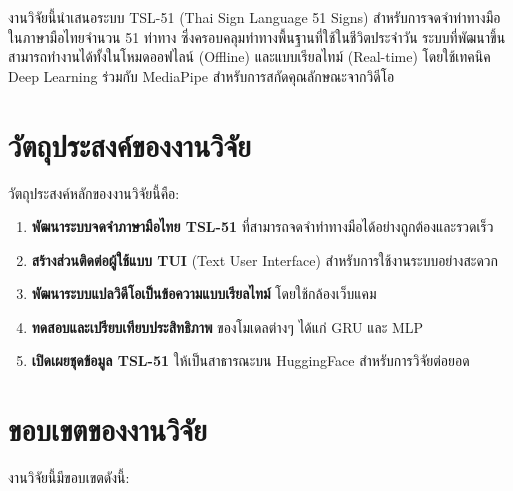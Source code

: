 \documentclass[12pt,a4paper]{report}
\begin{document}
งานวิจัยนี้นำเสนอระบบ TSL-51 (Thai Sign Language 51 Signs) สำหรับการจดจำท่าทางมือในภาษามือไทยจำนวน 51 ท่าทาง 
ซึ่งครอบคลุมท่าทางพื้นฐานที่ใช้ในชีวิตประจำวัน ระบบที่พัฒนาขึ้นสามารถทำงานได้ทั้งในโหมดออฟไลน์ (Offline) 
และแบบเรียลไทม์ (Real-time) โดยใช้เทคนิค Deep Learning ร่วมกับ MediaPipe สำหรับการสกัดคุณลักษณะจากวิดีโอ

\section{วัตถุประสงค์ของงานวิจัย}

วัตถุประสงค์หลักของงานวิจัยนี้คือ:

\begin{enumerate}
    \item \textbf{พัฒนาระบบจดจำภาษามือไทย TSL-51} ที่สามารถจดจำท่าทางมือได้อย่างถูกต้องและรวดเร็ว
    \item \textbf{สร้างส่วนติดต่อผู้ใช้แบบ TUI} (Text User Interface) สำหรับการใช้งานระบบอย่างสะดวก
    \item \textbf{พัฒนาระบบแปลวิดีโอเป็นข้อความแบบเรียลไทม์} โดยใช้กล้องเว็บแคม
    \item \textbf{ทดสอบและเปรียบเทียบประสิทธิภาพ} ของโมเดลต่างๆ ได้แก่ GRU และ MLP
    \item \textbf{เปิดเผยชุดข้อมูล TSL-51} ให้เป็นสาธารณะบน HuggingFace สำหรับการวิจัยต่อยอด
\end{enumerate}

\section{ขอบเขตของงานวิจัย}

งานวิจัยนี้มีขอบเขตดังนี้:
\end{document}
